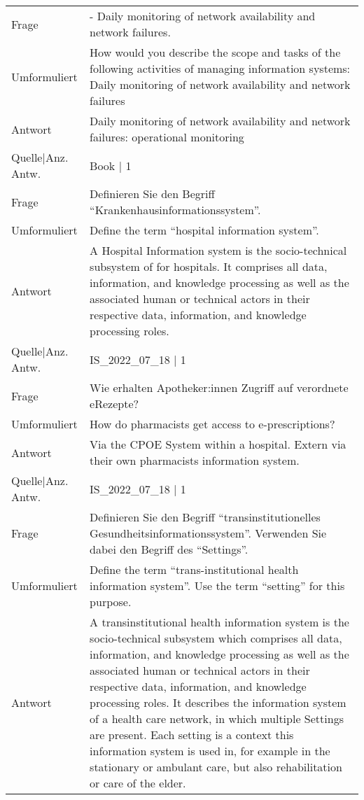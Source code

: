 {\begin{landscape}
\begin{longtable}{p{3cm}p{}}
    \midrule
    Frage & - Daily monitoring of network availability and network failures.\\
    Umformuliert & How would you describe the scope and tasks of the following activities of managing information systems: Daily monitoring of network availability and network failures \\
    Antwort & Daily monitoring of network availability and network failures: operational monitoring \\
    Quelle|Anz. Antw. & Book | 1 \\
    \midrule
    Frage & Definieren Sie den Begriff ``Krankenhausinformationssystem''. \\
    Umformuliert & Define the term ``hospital information system''. \\
    Antwort & A Hospital Information system is the socio-technical subsystem of for hospitals.
    It comprises all data, information, and knowledge processing as well as the associated human or technical actors in their respective data, information, and knowledge processing roles.\\
    Quelle|Anz. Antw. & IS\_2022\_07\_18 | 1 \\
    \midrule
    Frage & Wie erhalten Apotheker:innen Zugriff auf verordnete eRezepte? \\
    Umformuliert & How do pharmacists get access to e-prescriptions? \\
    Antwort & Via the CPOE System within a hospital.
    Extern via their own pharmacists information system.\\
    Quelle|Anz. Antw. & IS\_2022\_07\_18 | 1 \\
    \midrule
    Frage & Definieren Sie den Begriff ``transinstitutionelles Gesundheitsinformationssystem''. Verwenden Sie dabei den Begriff des ``Settings''. \\
    Umformuliert & Define the term ``trans-institutional health information system''. Use the term ``setting'' for this purpose.\\
    Antwort & A transinstitutional health information system is the socio-technical subsystem which comprises all data, information, and knowledge processing as well as the associated human or technical actors in their respective data, information, and knowledge processing roles.
    It describes the information system of a health care network, in which multiple Settings are present.
    Each setting is a context this information system is used in, for example in the stationary or ambulant care, but also rehabilitation or care of the elder.\\

\end{longtable}
\end{landscape}}
